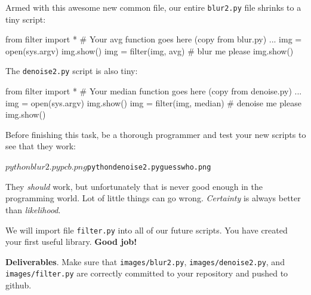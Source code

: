 Armed with this awesome new common file, our entire {\tt blur2.py} file shrinks to a tiny script:

\begin{pyverbatim}
from filter import *
# Your avg function goes here (copy from blur.py)
...
img = open(sys.argv)
img.show()
img = filter(img, avg)		# blur me please
img.show()
\end{pyverbatim}

\noindent The {\tt denoise2.py} script is also tiny:

\begin{pyverbatim}
from filter import *
# Your median function goes here (copy from denoise.py)
...
img = open(sys.argv)
img.show()
img = filter(img, median)	# denoise me please
img.show()
\end{pyverbatim}

\begin{callout}{\bctakecare}
Before finishing this task, be a thorough programmer and test your new scripts to see that they work:
\begin{alltt}
$ python blur2.py pcb.png
$ python denoise2.py guesswho.png
\end{alltt}
They {\em should} work, but unfortunately that is never good enough in the programming world.  Lot of little things can go wrong. {\em Certainty} is always better than {\em likelihood}.
\end{callout}

We will import file {\tt filter.py} into all of our future scripts. You have created your first useful library. {\bf Good job!} \scalebox{.55}{\bcsmbh}

\begin{callout}{\bcplume}
{\bf Deliverables}. Make sure that {\tt images/blur2.py}, {\tt images/denoise2.py}, and {\tt images/filter.py} are correctly committed to your repository and pushed to github.
\end{callout}

